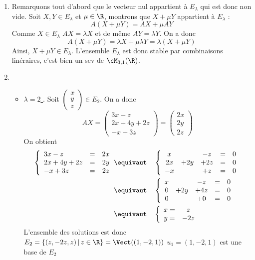 \begin{correction}
\begin{enumerate}
\item Remarquons tout d'abord que le vecteur nul appartient à $E_\lambda$ qui est donc non vide. Soit $X, Y\in E_\lambda$ et $\mu\in \R$, montrons que $X+\mu Y$ appartient à $E_\lambda$ :
$$A (X+\mu Y) = AX +\mu A Y$$ 
Comme $X\in E_\lambda$ $AX =\lambda X$ et de même $AY =\lambda Y$. 
On a donc 
$$A(X+\mu Y) =\lambda X +\mu \lambda Y = \lambda (X+\mu Y)$$
Ainsi, $X+\mu Y \in E_\lambda$. L'ensemble $E_\lambda$ est donc stable par combinaisons linéraires, c'est bien un sev de $\cM_{3,1} (\R)$. 
\item \begin{itemize}
\item \underline{$\lambda =2$ }.  Soit $\left(\begin{array}{c}
x\\
y\\
z
\end{array} \right)\in E_2$. 
On a donc 
$$AX = \left(\begin{array}{c}
3x-z\\
2x+4y+2z\\
-x+3z
\end{array} \right) = \left(\begin{array}{c}
2x\\
2y\\
2z
\end{array} \right)$$
On obtient 
\begin{align*}
\left\{ 
\begin{array}{lcc}
3x-z &=&2x\\
2x+4y+2z &=& 2y\\
-x+3z &=& 2z
\end{array} \right. &\equivaut \quad \left\{ 
\begin{array}{ccccc}
x& &-z &=&0\\
2x&+2y&+2z &=& 0\\
-x& &+z &=& 0
\end{array} \right. \\
&\equivaut \quad \left\{ 
\begin{array}{ccccc}
x& &-z &=&0\\
0&+2y&+4z &=& 0\\
0& &+0 &=& 0
\end{array} \right. \\
&\equivaut \quad \left\{ 
\begin{array}{cc}
x=&z\\
y =& -2z\\
\end{array} \right. 
\end{align*}
L'ensemble des solutions est donc $E_2= \{ (z,-2z,z) \, |\, z\in \R\} = \Vect( (1,-2,1))$ 
$u_1 =(1,-2,1)$  est une base de $E_2$



\end{itemize}
\end{enumerate}
\end{correction}
